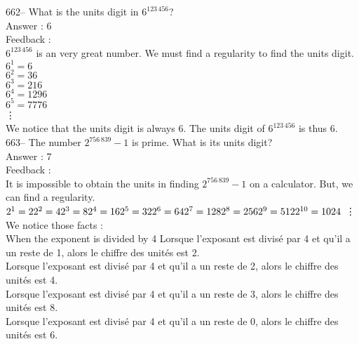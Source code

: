 \documentclass[letterpaper, 12pt]{article}
\begin{document}
662-- What is the units digit in $6^{123\,456}$?\\

Answer : 6\\

Feedback : \\
$6^{123\,456}$ is an very great number. We must find a regularity to find the units digit.\\
$6^{1}=6$\\
$6^{2}=36$\\
$6^{3}=216$\\
$6^{4}=1296$\\
$6^{5}=7776$\\
\vdots\\
We notice that the units digit is always 6. The units digit of $6^{123\,456}$ is thus 6.  \\

663--  The number $2^{756\,839}-1$ is prime. What is its units digit?\\

Answer : 7\\

Feedback : \\
It is impossible to obtain the units in finding $2^{756\,839}-1$ on a calculator. But, we can find a regularity.
  \\
$2^{1}  = 2\\
2^{2}  = 4\\
2^{3}  = 8\\
2^{4} = 16\\
2^{5}  = 32\\
2^{6}  = 64\\
2^{7}  = 128\\
2^{8}= 256\\
2^{9}  = 512\\
2^{10} = 1024\\$ \vdots\\
We notice those facts :\\
When the exponent is divided by 4 Lorsque l'exposant est divis\'e par 4 et qu'il a un reste de 1, alors le
chiffre des unit\'es est 2.\\
Lorsque l'exposant est divis\'e par 4 et qu'il a un reste de 2, alors le
chiffre des unit\'es est 4.\\
Lorsque l'exposant est divis\'e par 4 et qu'il a un reste de 3, alors le
chiffre des unit\'es est 8.\\
Lorsque l'exposant est divis\'e par 4 et qu'il a un reste de 0, alors le
chiffre des unit\'es est 6.\\
\end{document}
